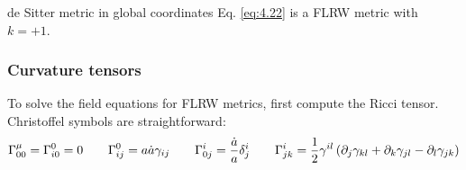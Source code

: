 \begin{example}
  de Sitter metric in global coordinates Eq. \ref{eq:4.22} is a FLRW metric with $ k = +1 $.
\end{example}

\subsubsection{Curvature tensors}

To solve the field equations for FLRW metrics, first compute the Ricci tensor. Christoffel symbols are straightforward:
\begin{equation*}
  \Gamma^\mu_{00} = \Gamma^0_{i0} = 0
  \qquad
  \Gamma^0_{ij} = a\dot{a} \gamma_{ij}
  \qquad
  \Gamma^i_{0j} = \frac{\dot{a}}{a} \delta^i_j
  \qquad
  \Gamma^i_{jk} = \frac{1}{2} \gamma^{il} \left( \partial_j \gamma_{kl} + \partial_k \gamma_{jl} - \partial_l \gamma_{jk} \right)
\end{equation*}

